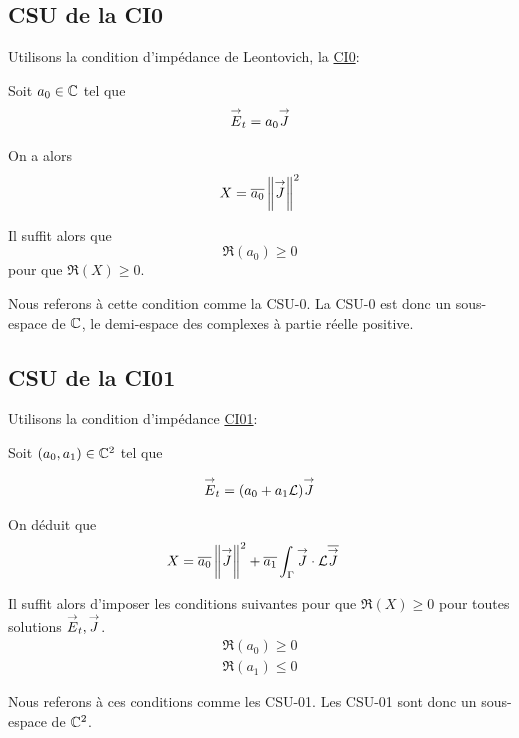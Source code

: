   \subsection{CSU de la CI0}
    Utilisons la condition d’impédance de Leontovich, la \hyperlink{ci0}{CI0}:

    Soit \(a_0 \in \mathbb C\) tel que
    \begin{align*}
      {\overset{\rightarrow}{E}}_t = a_0 {\overset{\rightarrow}{J}}
    \end{align*}

    On a alors
    \begin{equation*}
      X = {\overline{a_0}}\left\lVert{\overset{\rightarrow}{J}}\right\rVert^2
    \end{equation*}

    Il suffit alors que
    \begin{equation}
      \Re\left(a_0\right) \ge 0
    \end{equation}
    pour que \(\Re(X)\ge0\).

    Nous referons à cette condition comme la CSU-0. La CSU-0 est donc un sous-espace de \(\mathbb C\), le demi-espace des complexes à partie réelle positive.

  \subsection{CSU de la CI01}
    Utilisons la condition d’impédance \hyperlink{ci01}{CI01}:

    Soit \((a_0, a_1) \in \mathbb C^2\) tel que

    \begin{align*}
      {\overset{\rightarrow}{E}}_t = (a_0 +a_1 \mathcal{L}){\overset{\rightarrow}{J}}
    \end{align*}

    On déduit que
    \begin{align*}
      X & = {\overline{a_0}} \left\lVert{\overset{\rightarrow}{J}}\right\rVert ^2 + {\overline{a_1}}\int_\Gamma {\overset{\rightarrow}{J}}\cdot \mathcal{L}{\overline{{\overset{\rightarrow}{J}}}}
    \end{align*}

    Il suffit alors d'imposer les conditions suivantes pour que \(\Re(X)\ge 0\) pour toutes solutions \({\overset{\rightarrow}{E}}_t,{\overset{\rightarrow}{J}}\).
    \begin{align}
      \Re\left(a_0\right) \ge 0\\
      \Re\left(a_1\right) \le 0
    \end{align}

    Nous referons à ces conditions comme les CSU-01. Les CSU-01 sont donc un sous-espace de \(\mathbb C^2\).


